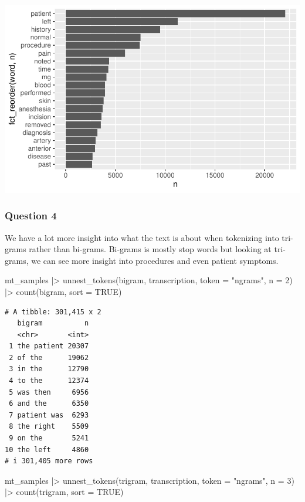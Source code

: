 \documentclass[
  letterpaper,
  DIV=11,
  numbers=noendperiod]{scrartcl}
\newenvironment{Shaded}{\begin{snugshade}}{\end{snugshade}}
\newcommand{\AttributeTok}[1]{\textcolor[rgb]{0.40,0.45,0.13}{#1}}
\newcommand{\ConstantTok}[1]{\textcolor[rgb]{0.56,0.35,0.01}{#1}}
\newcommand{\DecValTok}[1]{\textcolor[rgb]{0.68,0.00,0.00}{#1}}
\newcommand{\FunctionTok}[1]{\textcolor[rgb]{0.28,0.35,0.67}{#1}}
\newcommand{\NormalTok}[1]{\textcolor[rgb]{0.00,0.23,0.31}{#1}}
\newcommand{\SpecialCharTok}[1]{\textcolor[rgb]{0.37,0.37,0.37}{#1}}
\newcommand{\StringTok}[1]{\textcolor[rgb]{0.13,0.47,0.30}{#1}}
\begin{document}
\includegraphics{Lab-6_files/figure-pdf/unnamed-chunk-4-1.pdf}

\subsubsection{Question 4}\label{question-4}

We have a lot more insight into what the text is about when tokenizing
into tri-grams rather than bi-grams. Bi-grams is mostly stop words but
looking at tri-grams, we can see more insight into procedures and even
patient symptoms.

\begin{Shaded}
\begin{Highlighting}[]
\NormalTok{mt\_samples }\SpecialCharTok{|\textgreater{}} 
\FunctionTok{unnest\_tokens}\NormalTok{(bigram, transcription, }\AttributeTok{token =} \StringTok{"ngrams"}\NormalTok{, }\AttributeTok{n =} \DecValTok{2}\NormalTok{) }\SpecialCharTok{|\textgreater{}}
\FunctionTok{count}\NormalTok{(bigram, }\AttributeTok{sort =} \ConstantTok{TRUE}\NormalTok{)}
\end{Highlighting}
\end{Shaded}

\begin{verbatim}
# A tibble: 301,415 x 2
   bigram          n
   <chr>       <int>
 1 the patient 20307
 2 of the      19062
 3 in the      12790
 4 to the      12374
 5 was then     6956
 6 and the      6350
 7 patient was  6293
 8 the right    5509
 9 on the       5241
10 the left     4860
# i 301,405 more rows
\end{verbatim}

\begin{Shaded}
\begin{Highlighting}[]
\NormalTok{mt\_samples }\SpecialCharTok{|\textgreater{}}
  \FunctionTok{unnest\_tokens}\NormalTok{(trigram, transcription, }\AttributeTok{token =} \StringTok{"ngrams"}\NormalTok{, }\AttributeTok{n =} \DecValTok{3}\NormalTok{) }\SpecialCharTok{|\textgreater{}}
  \FunctionTok{count}\NormalTok{(trigram, }\AttributeTok{sort =} \ConstantTok{TRUE}\NormalTok{)}
\end{Highlighting}
\end{Shaded}
\end{document}
